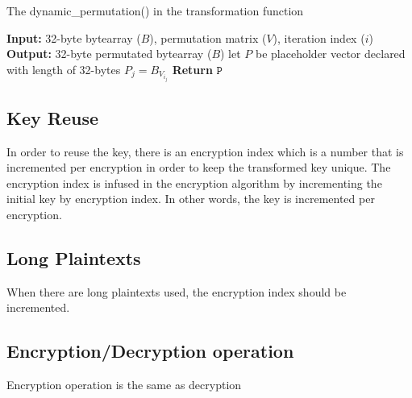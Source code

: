 \documentclass[fleqn, a4paper,12pt]{article}
\begin{document}
\begin{algorithm}[H] %
\caption{The dynamic\_permutation() in the transformation function}
\begin{algorithmic}[1]  %
\State \textbf{Input:} 32-byte bytearray ($B$), permutation matrix ($V$), iteration index ($i$)
\State \textbf{Output:} 32-byte permutated bytearray ($B$)
\State let $P$ be placeholder vector declared with length of 32-bytes
		\State $P_j = B_{V_{i_j}}$
\EndFor
\State \textbf{Return} $\texttt{P}$
\end{algorithmic}
\end{algorithm}

\subsection {Key Reuse}

In order to reuse the key, there is an encryption index which is a number that is incremented per encryption in order to keep the transformed key unique. The encryption index is infused in the encryption algorithm by incrementing the initial key by encryption index. In other words, the key is incremented per encryption.

\subsection {Long Plaintexts}

When there are long plaintexts used, the encryption index should be incremented.

\subsection {Encryption/Decryption operation}

Encryption operation is the same as decryption
\end{document}
